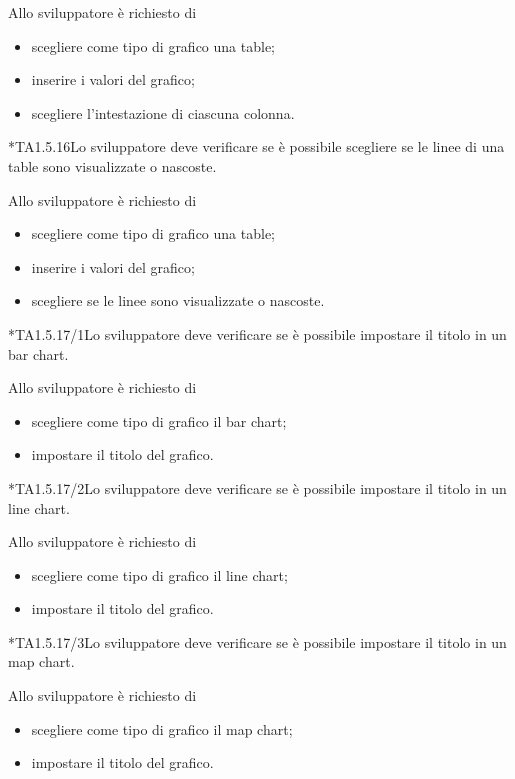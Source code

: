 		Allo sviluppatore è richiesto di
		\begin{itemize}
			\item scegliere come tipo di grafico una table;
			\item inserire i valori del grafico;
			\item scegliere l'intestazione di ciascuna colonna.
		\end{itemize}

	*{TA1.5.16}Lo sviluppatore deve verificare se è possibile scegliere se le linee di una table sono visualizzate o nascoste.

		Allo sviluppatore è richiesto di
		\begin{itemize}
			\item scegliere come tipo di grafico una table;
			\item inserire i valori del grafico;
			\item scegliere se le linee sono visualizzate o nascoste.
		\end{itemize}

	*{TA1.5.17/1}Lo sviluppatore deve verificare se è possibile impostare il titolo in un bar chart.

		Allo sviluppatore è richiesto di
		\begin{itemize}
			\item scegliere come tipo di grafico il bar chart;
			\item impostare il titolo del grafico.
		\end{itemize}

	*{TA1.5.17/2}Lo sviluppatore deve verificare se è possibile impostare il titolo in un line chart.

		Allo sviluppatore è richiesto di
		\begin{itemize}
			\item scegliere come tipo di grafico il line chart;
			\item impostare il titolo del grafico.
		\end{itemize}

	*{TA1.5.17/3}Lo sviluppatore deve verificare se è possibile impostare il titolo in un map chart.

		Allo sviluppatore è richiesto di
		\begin{itemize}
			\item scegliere come tipo di grafico il map chart;
			\item impostare il titolo del grafico.
		\end{itemize}

